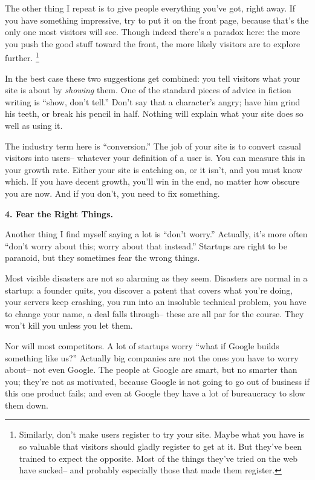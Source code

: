 \documentclass[12pt]{book}
\begin{document}
The other thing I repeat is to give people everything you've got, right
away. If you have something impressive, try to put it on the front page,
because that's the only one most visitors will see. Though indeed
there's a paradox here: the more you push the good stuff toward the
front, the more likely visitors are to explore further.
\footnote{Similarly, don't make users register to try your site. Maybe
what you have is so valuable that visitors should gladly register to get
at it. But they've been trained to expect the opposite. Most of the
things they've tried on the web have sucked-- and probably especially
those that made them register.}

In the best case these two suggestions get combined: you tell visitors
what your site is about by \emph{showing} them. One of the standard
pieces of advice in fiction writing is ``show, don't tell.'' Don't say
that a character's angry; have him grind his teeth, or break his pencil
in half. Nothing will explain what your site does so well as using it.

The industry term here is ``conversion.'' The job of your site is to
convert casual visitors into users-- whatever your definition of a user
is. You can measure this in your growth rate. Either your site is
catching on, or it isn't, and you must know which. If you have decent
growth, you'll win in the end, no matter how obscure you are now. And if
you don't, you need to fix something.

\textbf{4. Fear the Right Things.}

Another thing I find myself saying a lot is ``don't worry.'' Actually,
it's more often ``don't worry about this; worry about that instead.''
Startups are right to be paranoid, but they sometimes fear the wrong
things.

Most visible disasters are not so alarming as they seem. Disasters are
normal in a startup: a founder quits, you discover a patent that covers
what you're doing, your servers keep crashing, you run into an insoluble
technical problem, you have to change your name, a deal falls through--
these are all par for the course. They won't kill you unless you let
them.

Nor will most competitors. A lot of startups worry ``what if Google
builds something like us?'' Actually big companies are not the ones you
have to worry about-- not even Google. The people at Google are smart,
but no smarter than you; they're not as motivated, because Google is not
going to go out of business if this one product fails; and even at
Google they have a lot of bureaucracy to slow them down.
\end{document}
